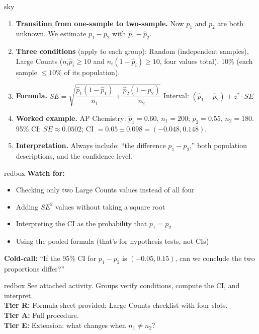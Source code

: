 \documentclass[10pt]{article}
\begin{document}
\begin{skillbox}[Lesson]{sky}
    \begin{enumerate}[leftmargin=1.4em, label=\arabic*.]
        \item \textbf{Transition from one-sample to two-sample.} Now $p_1$ and $p_2$ are both
              unknown. We estimate $p_1 - p_2$ with $\hat p_1 - \hat p_2$.

        \item \textbf{Three conditions} (apply to each group):
              Random (independent samples), Large Counts ($n_i\hat p_i \ge 10$ and $n_i(1-\hat p_i) \ge 10$,
              four values total), 10\% (each sample $\le 10\%$ of its population).

        \item \textbf{Formula.}
              $SE = \sqrt{\dfrac{\hat p_1(1-\hat p_1)}{n_1} + \dfrac{\hat p_2(1-\hat p_2)}{n_2}}$
              Interval: $(\hat p_1 - \hat p_2) \pm z^* \cdot SE$

        \item \textbf{Worked example.} AP Chemistry: $\hat p_1=0.60$, $n_1=200$; $\hat p_2=0.55$, $n_2=180$.
              95\% CI: $SE \approx 0.0502$; CI $= 0.05 \pm 0.098 = (-0.048, 0.148)$.

        \item \textbf{Interpretation.} Always include: ``the difference $p_1 - p_2$,'' both
              population descriptions, and the confidence level.
    \end{enumerate}
\end{skillbox}

\begin{skillbox}{redbox}
    \textbf{Watch for:}
    \begin{itemize}[leftmargin=1.2em]
        \item Checking only two Large Counts values instead of all four
        \item Adding $SE^2$ values without taking a square root
        \item Interpreting the CI as the probability that $p_1=p_2$
        \item Using the pooled formula (that's for hypothesis tests, not CIs)
    \end{itemize}
    \textbf{Cold-call:} ``If the 95\% CI for $p_1-p_2$ is $(-0.05, 0.15)$, can we conclude
    the two proportions differ?''
\end{skillbox}

\begin{skillbox}{redbox}
    See attached activity. Groups verify conditions, compute the CI, and interpret.\\[4pt]
    \textbf{Tier R:} Formula sheet provided; Large Counts checklist with four slots.\\
    \textbf{Tier A:} Full procedure.\\
    \textbf{Tier E:} Extension: what changes when $n_1 \ne n_2$?
\end{skillbox}
\end{document}
